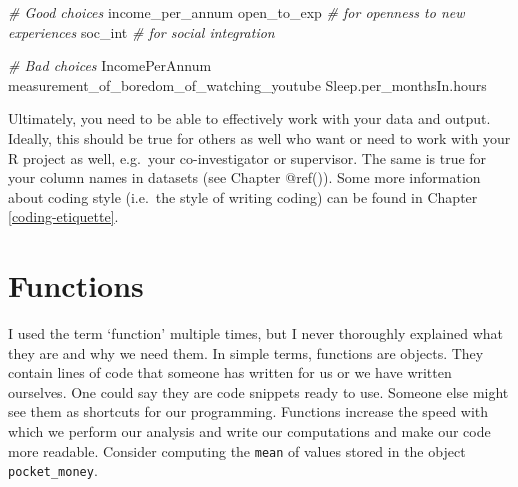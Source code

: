 \documentclass[
]{book}
\newenvironment{Shaded}{\begin{snugshade}}{\end{snugshade}}
\newcommand{\CommentTok}[1]{\textcolor[rgb]{0.56,0.35,0.01}{\textit{#1}}}
\newcommand{\NormalTok}[1]{#1}
\begin{document}
\begin{Shaded}
\begin{Highlighting}[]
\CommentTok{\# Good choices}
\NormalTok{income\_per\_annum}
\NormalTok{open\_to\_exp          }\CommentTok{\# for \textquotesingle{}openness to new experiences\textquotesingle{}}
\NormalTok{soc\_int              }\CommentTok{\# for \textquotesingle{}social integration\textquotesingle{}}
 
\CommentTok{\# Bad choices}
\NormalTok{IncomePerAnnum}
\NormalTok{measurement\_of\_boredom\_of\_watching\_youtube}
\NormalTok{Sleep.per\_monthsIn.hours}
\end{Highlighting}
\end{Shaded}

Ultimately, you need to be able to effectively work with your data and output. Ideally, this should be true for others as well who want or need to work with your R project as well, e.g.~your co-investigator or supervisor. The same is true for your column names in datasets (see Chapter @ref()). Some more information about coding style (i.e.~the style of writing coding) can be found in Chapter \ref{coding-etiquette}.

\hypertarget{functions}{%
\section{Functions}\label{functions}}

I used the term `function' multiple times, but I never thoroughly explained what they are and why we need them. In simple terms, functions are objects. They contain lines of code that someone has written for us or we have written ourselves. One could say they are code snippets ready to use. Someone else might see them as shortcuts for our programming. Functions increase the speed with which we perform our analysis and write our computations and make our code more readable. Consider computing the \texttt{mean} of values stored in the object \texttt{pocket\_money}.
\end{document}
